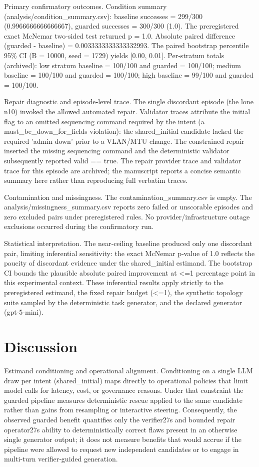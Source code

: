 \documentclass[conference]{IEEEtran}
\begin{document}
Primary confirmatory outcomes. Condition summary (analysis/condition\_summary.csv): baseline successes = 299/300 (0.9966666666666667), guarded successes = 300/300 (1.0). The preregistered exact McNemar two‑sided test returned p = 1.0. Absolute paired difference (guarded - baseline) = 0.0033333333333332993. The paired bootstrap percentile 95\% CI (B = 10000, seed = 1729) yields [0.00, 0.01]. Per‑stratum totals (archived): low stratum baseline = 100/100 and guarded = 100/100; medium baseline = 100/100 and guarded = 100/100; high baseline = 99/100 and guarded = 100/100.

Repair diagnostic and episode‑level trace. The single discordant episode (the lone n10) invoked the allowed automated repair. Validator traces attribute the initial flag to an omitted sequencing command required by the intent (a must\_be\_down\_for\_fields violation): the shared\_initial candidate lacked the required 'admin down' prior to a VLAN/MTU change. The constrained repair inserted the missing sequencing command and the deterministic validator subsequently reported valid == true. The repair provider trace and validator trace for this episode are archived; the manuscript reports a concise semantic summary here rather than reproducing full verbatim traces.

Contamination and missingness. The contamination\_summary.csv is empty. The analysis/missingness\_summary.csv reports zero failed or unscorable episodes and zero excluded pairs under preregistered rules. No provider/infrastructure outage exclusions occurred during the confirmatory run.

Statistical interpretation. The near‑ceiling baseline produced only one discordant pair, limiting inferential sensitivity: the exact McNemar p‑value of 1.0 reflects the paucity of discordant evidence under the shared\_initial estimand. The bootstrap CI bounds the plausible absolute paired improvement at <=1 percentage point in this experimental context. These inferential results apply strictly to the preregistered estimand, the fixed repair budget (<=1), the synthetic topology suite sampled by the deterministic task generator, and the declared generator (gpt-5-mini).

\section{Discussion}
Estimand conditioning and operational alignment. Conditioning on a single LLM draw per intent (shared\_initial) maps directly to operational policies that limit model calls for latency, cost, or governance reasons. Under that constraint the guarded pipeline measures deterministic rescue applied to the same candidate rather than gains from resampling or interactive steering. Consequently, the observed guarded benefit quantifies only the verifier 27s and bounded repair operator 27s ability to deterministically correct flaws present in an otherwise single generator output; it does not measure benefits that would accrue if the pipeline were allowed to request new independent candidates or to engage in multi‑turn verifier‑guided generation.
\end{document}
